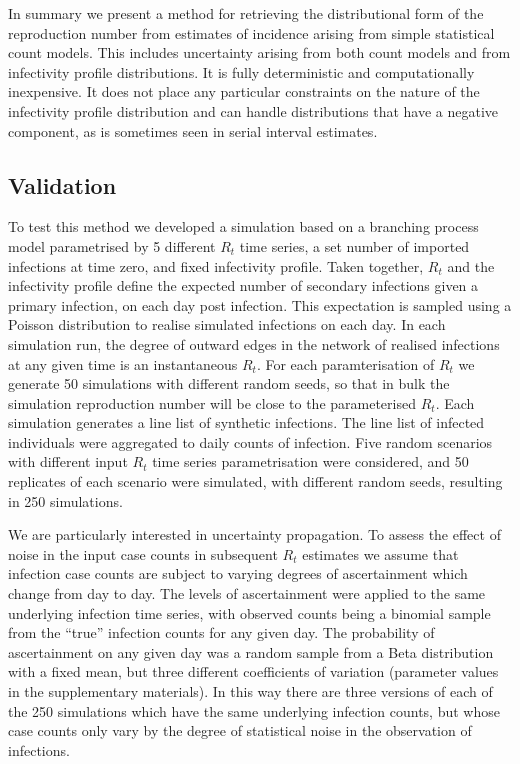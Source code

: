 \documentclass[10pt,letterpaper]{article}
\begin{document}
In summary we present a method for retrieving the distributional form of the reproduction number from estimates of incidence arising from simple statistical count models. This includes uncertainty arising from both count models and from infectivity profile distributions. It is fully deterministic and computationally inexpensive. It does not place any particular constraints on the nature of the infectivity profile distribution and can handle distributions that have a negative component, as is sometimes seen in serial interval estimates.

\subsection*{Validation}

To test this method we developed a simulation based on a branching process model parametrised by 5 different $R_t$ time series, a set number of imported infections at time zero, and fixed infectivity profile. Taken together, $R_t$ and the infectivity profile define the expected number of secondary infections given a primary infection, on each day post infection. This expectation is sampled using a Poisson distribution to realise simulated infections on each day. In each simulation run, the degree of outward edges in the network of realised infections at any given time is an instantaneous $R_t$. For each paramterisation of $R_t$ we generate 50 simulations with different random seeds, so that in bulk the simulation reproduction number will be close to the parameterised $R_t$. Each simulation generates a line list of synthetic infections. The line list of infected individuals were aggregated to daily counts of infection. Five random scenarios with different input $R_t$ time series parametrisation were considered, and 50 replicates of each scenario were simulated, with different random seeds, resulting in 250 simulations.

We are particularly interested in uncertainty propagation. To assess the effect of noise in the input case counts in subsequent $R_t$ estimates we assume that infection case counts are subject to varying degrees of ascertainment which change from day to day. The levels of ascertainment were applied to the same underlying infection time series, with observed counts being a binomial sample from the ``true'' infection counts for any given day. The probability of ascertainment on any given day was a random sample from a Beta distribution with a fixed mean, but three different coefficients of variation (parameter values in the supplementary materials). In this way there are three versions of each of the 250 simulations which have the same underlying infection counts, but whose case counts only vary by the degree of statistical noise in the observation of infections.
\end{document}
